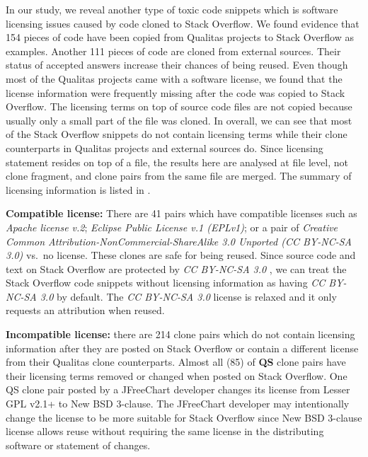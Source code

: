\documentclass[10pt,journal,compsoc]{IEEEtran}
\begin{document}
In our study, we reveal another type of toxic code snippets which is software
licensing issues caused by code cloned to Stack Overflow. We found evidence that
154 pieces of code have been copied from Qualitas projects to Stack Overflow as
examples. Another 111 pieces of code are cloned from external sources. Their
status of accepted answers increase their chances of being reused. Even though
most of the Qualitas projects came with a software license, we found that the
license information were frequently missing after the code was copied to Stack
Overflow. The licensing terms on top of source code files are not copied because
usually only a small part of the file was cloned. In overall, we can see that
most of the Stack Overflow snippets do not contain licensing terms while their
clone counterparts in Qualitas projects and external sources do. Since licensing
statement resides on top of a file, the results here are analysed at file level,
not clone fragment, and clone pairs from the same file are merged. 
The summary of licensing information is listed in
.

\textbf{Compatible license:} There are 41 pairs which have compatible
licenses such as \emph{Apache license v.2}; \emph{Eclipse Public
	License v.1 (EPLv1)}; or a pair of \emph{Creative
	Common Attribution-NonCommercial-ShareAlike 3.0 Unported (CC
	BY-NC-SA 3.0)} vs.~no license. These clones are safe for being reused. Since source
code and text on Stack Overflow are
protected by \emph{CC BY-NC-SA 3.0}
, we can treat the Stack Overflow code snippets
without licensing information as having \emph{CC BY-NC-SA 3.0} by
default. The \emph{CC BY-NC-SA 3.0} license is relaxed and it only
requests an attribution when reused.

\textbf{Incompatible license:} there are 214 clone pairs which do not contain
licensing information after they are posted on Stack Overflow or contain a
different license from their Qualitas clone counterparts. Almost all (85) of
\textbf{QS} clone pairs have their licensing terms removed or changed when
posted on Stack Overflow. One QS clone pair posted by a JFreeChart developer
changes its license from Lesser GPL v2.1+ to New BSD 3-clause. The JFreeChart
developer may intentionally change the license to be more suitable for Stack
Overflow since New BSD 3-clause license allows reuse without requiring the same
license in the distributing software or statement of changes. 
\end{document}
